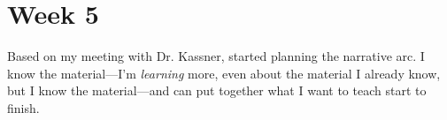 
\section{Week 5}

Based on my meeting with Dr. Kassner, started planning the narrative arc.  I know the material—I'm \textit{learning} more, even about the material I already know, but I know the material—and can put together what I want to teach start to finish.


